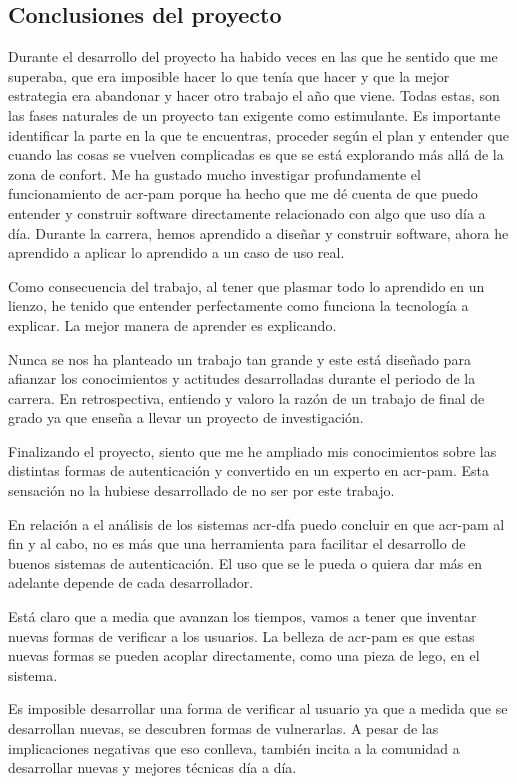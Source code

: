 \documentclass[titlepage, 12pt, a4paper]{article}
\begin{document}
{\subsection{Conclusiones del proyecto}
Durante el desarrollo del proyecto ha habido veces en las que he sentido que me superaba, que era imposible hacer lo que tenía que hacer y que la mejor estrategia era abandonar y hacer otro trabajo el año que viene. Todas estas, son las fases naturales de un proyecto tan exigente como estimulante. Es importante identificar la parte en la que te encuentras, proceder según el plan y entender que cuando las cosas se vuelven complicadas es que se está explorando más allá de la zona de confort.
Me ha gustado mucho investigar profundamente el funcionamiento de \gls{acr-pam} porque ha hecho que me dé cuenta de que puedo entender y construir software directamente relacionado con algo que uso día a día. Durante la carrera, hemos aprendido a diseñar y construir software, ahora he aprendido a aplicar lo aprendido a un caso de uso real.\par
Como consecuencia del trabajo, al tener que plasmar todo lo aprendido en un lienzo, he tenido que entender perfectamente como funciona la tecnología a explicar. La mejor manera de aprender es explicando.\par
Nunca se nos ha planteado un trabajo tan grande y este está diseñado para afianzar los conocimientos y actitudes desarrolladas durante el periodo de la carrera. En retrospectiva, entiendo y valoro la razón de un trabajo de final de grado ya que enseña a llevar un proyecto de investigación. \par
Finalizando el proyecto, siento que me he ampliado mis conocimientos sobre las distintas formas de autenticación y convertido en un experto en \gls{acr-pam}. Esta sensación no la hubiese desarrollado de no ser por este trabajo.\par
En relación a el análisis de los sistemas \gls{acr-dfa} puedo concluir en que \gls{acr-pam} al fin y al cabo, no es más que una herramienta para facilitar el desarrollo de buenos sistemas de autenticación. El uso que se le pueda o quiera dar más en adelante depende de cada desarrollador. \par
Está claro que a media que avanzan los tiempos, vamos a tener que inventar nuevas formas de verificar a los usuarios. La belleza de \gls{acr-pam} es que estas nuevas formas se pueden acoplar directamente, como una pieza de lego, en el sistema.\par
Es imposible desarrollar una forma de verificar al usuario ya que a medida que se desarrollan nuevas, se descubren formas de vulnerarlas. A pesar de las implicaciones negativas que eso conlleva, también incita a la comunidad a desarrollar nuevas y mejores técnicas día a día.
}
\end{document}

